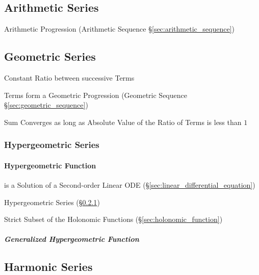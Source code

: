 \subsection{Arithmetic Series}\label{sec:arithmetic_series}

Arithmetic Progression (Arithmetic Sequence
\S\ref{sec:arithmetic_sequence})



\subsection{Geometric Series}\label{sec:geometric_series}

Constant Ratio between successive Terms

Terms form a Geometric Progression (Geometric Sequence
\S\ref{sec:geometric_sequence})

Sum Converges as long as Absolute Value of the Ratio of Terms is less
than $1$



\subsubsection{Hypergeometric Series}\label{sec:hypergeometric_series}

\paragraph{Hypergeometric Function}\label{sec:hypergeometric_function}\hfill

is a Solution of a Second-order Linear ODE
(\S\ref{sec:linear_differential_equation})

Hypergeometric Series (\S\ref{sec:hypergeometric_series})

Strict Subset of the Holonomic Functions (\S\ref{sec:holonomic_function})



\subparagraph{Generalized Hypergeometric Function}
\label{sec:generalized_hypergeometric_function}\hfill



\subsection{Harmonic Series}\label{sec:harmonic_series}

